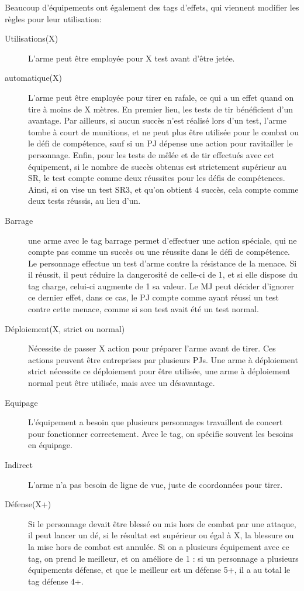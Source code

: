\documentclass{report}
\begin{document}
\begin{multicols}{2}
Beaucoup d'équipements ont également des tags d'effets, qui viennent modifier les règles pour leur utilisation:
\begin{description}
\item[Utilisations(X)]L'arme peut être employée pour X test avant d'être jetée.
\item[automatique(X)]L'arme peut être employée pour tirer en rafale, ce qui a un effet quand on tire à moins de X mètres. En premier lieu, les tests de tir bénéficient d'un avantage. Par ailleurs, si aucun succès n'est réalisé lors d'un test, l'arme tombe à court de munitions, et ne peut plus être utilisée pour le combat ou le défi de compétence, sauf si un PJ dépense une action pour ravitailler le personnage. Enfin, pour les tests de mêlée et de tir effectués avec cet équipement, si le nombre de succès obtenus est strictement supérieur au SR, le test compte comme deux réussites pour les défis de compétences. Ainsi, si on vise un test SR3, et qu'on obtient 4 succès, cela compte comme deux tests réussis, au lieu d'un.
\item[Barrage] une arme avec le tag barrage permet d'effectuer une action spéciale, qui ne compte pas comme un succès ou une réussite dans le défi de compétence. Le personnage effectue un test d'arme contre la résistance de la menace. Si il réussit, il peut réduire la dangerosité de celle-ci de 1, et si elle dispose du tag charge, celui-ci augmente de 1 sa valeur. Le MJ peut décider d'ignorer ce dernier effet, dans ce cas, le PJ compte comme ayant réussi un test contre cette menace, comme si son test avait été un test normal.
\item[Déploiement(X, strict ou normal)]Nécessite de passer X action pour préparer l'arme avant de tirer. Ces actions peuvent être entreprises par plusieurs PJs. Une arme à déploiement strict nécessite ce déploiement pour être utilisée, une arme à déploiement normal peut être utilisée, mais avec un désavantage.
\item[Equipage]L'équipement a besoin que plusieurs personnages travaillent de concert pour fonctionner correctement. Avec le tag, on spécifie souvent les besoins en équipage.
\item[Indirect]L'arme n'a pas besoin de ligne de vue, juste de coordonnées pour tirer.
\item[Défense(X+)] Si le personnage devait être blessé ou mis hors de combat par une attaque, il peut lancer un dé, si le résultat est supérieur ou égal à X, la blessure ou la mise hors de combat est annulée. Si on a plusieurs équipement avec ce tag, on prend le meilleur, et on améliore de 1 : si un personnage a plusieurs équipements défense, et que le meilleur est un défense 5+, il a au total le tag défense 4+.

\end{description}
\end{multicols}
\end{document}
